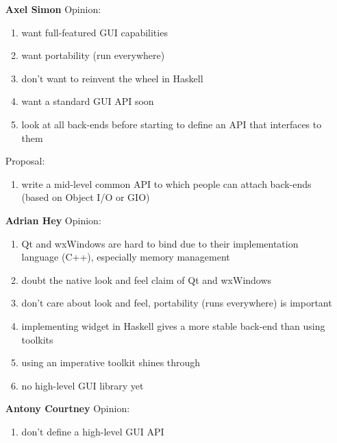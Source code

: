 \documentclass{article}
\newcommand{\Party}[1]{\stepcounter{enumi}\arabic{enumi} \bf #1}
\begin{document}
\begin{enumerate}
  
\item[\Party{Axel Simon}] Opinion:
  \begin{enumerate}
  \item \label{hinderas} want full-featured GUI capabilities
  \item \label{allas} want portability (run everywhere)
  \item don't want to reinvent the wheel in Haskell
  \item want a standard GUI API soon
  \item \label{scratchas} look at all back-ends before starting to define
    an API that interfaces to them
  \end{enumerate}
  Proposal:
  \begin{enumerate}
  \item \label{lowas} write a mid-level common API to which people can attach
    back-ends (based on Object I/O or GIO)
  \end{enumerate}
  
\item[\Party{Adrian Hey}] Opinion:
  \begin{enumerate}
  \item Qt and wxWindows are hard to bind due to their
    implementation language (C++), especially memory management
  \item \label{lookah} doubt the native look and feel claim of Qt and wxWindows
  \item \label{allah} don't care about look and feel, portability (runs
    everywhere) is important
  \item implementing widget in Haskell gives a more stable
    back-end than using toolkits
  \item using an imperative toolkit shines through %
  \item \label{highah}no high-level GUI library yet
  \end{enumerate}
  
\item[\Party{Antony Courtney}] Opinion:
  \begin{enumerate}
  \item \label{highac} don't define a high-level GUI API
  \end{enumerate}
  

\end{enumerate}
\end{document}
